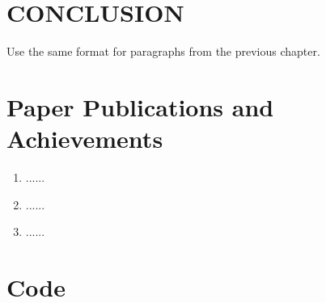 \documentclass[12pt,a4paper]{report}
\begin{document}
\chapter{CONCLUSION}
\thispagestyle{fancy}
\onehalfspacing
\hspace*{1cm}Use the same format for paragraphs from the previous chapter.





   
\newpage


\pagestyle{plain}
\appendix

\clearpage
\appendix
\renewcommand{\thechapter}{\Roman{chapter}}
\renewcommand*{\thepage}{\roman{page}}
\setcounter{page}{14} %

\chapter{Paper Publications and Achievements}
\begin{enumerate}
    \item ......
    \item ......
    \item ......
\end{enumerate}

\chapter{Code}
\end{document}
